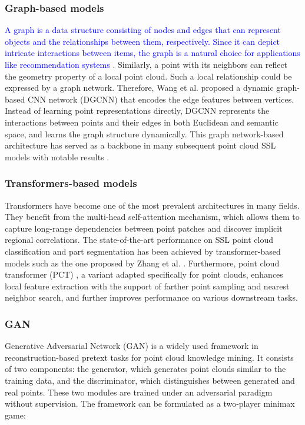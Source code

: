 \documentclass[a4paper,fleqn]{cas-dc}
\begin{document}
\subsubsection{Graph-based models}
\textcolor{blue}{A graph is a data structure consisting of nodes and edges that can represent objects and the relationships between them, respectively. Since it can depict intricate interactions between items, the graph is a natural choice for applications like recommendation systems \citep{wei2022contrastive,cai2023lightgcl}}. Similarly, a point with its neighbors can reflect the geometry property of a local point cloud. Such a local relationship could be expressed by a graph network. Therefore, Wang et al. proposed a dynamic graph-based CNN network (DGCNN) \citep{wang2019dynamic} that encodes the edge features between vertices. Instead of learning point representations directly, DGCNN represents the interactions between points and their edges in both Euclidean and semantic space, and learns the graph structure dynamically. This graph network-based architecture has served as a backbone in many subsequent point cloud SSL models with notable results \citep{poursaeed2020self,sauder2019self,afham2022crosspoint}.

\subsubsection{Transformers-based models}
Transformers have become one of the most prevalent architectures in many fields. They benefit from the multi-head self-attention mechanism, which allows them to capture long-range dependencies between point patches and discover implicit regional correlations. The state-of-the-art performance on SSL point cloud classification and part segmentation has been achieved by transformer-based models such as the one proposed by Zhang et al. \citep{zhang2022masked}. Furthermore, point cloud transformer (PCT) \citep{guo2021pct}, a variant adapted specifically for point clouds, enhances local feature extraction with the support of farther point sampling and nearest neighbor search, and further improves performance on various downstream tasks.

\subsubsection{GAN}
Generative Adversarial Network (GAN) \citep{goodfellow2014generative} is a widely used framework in reconstruction-based pretext tasks for point cloud knowledge mining. It consists of two components: the generator, which generates point clouds similar to the training data, and the discriminator, which distinguishes between generated and real points. These two modules are trained under an adversarial paradigm without supervision. The framework can be formulated as a two-player minimax game:
\end{document}
